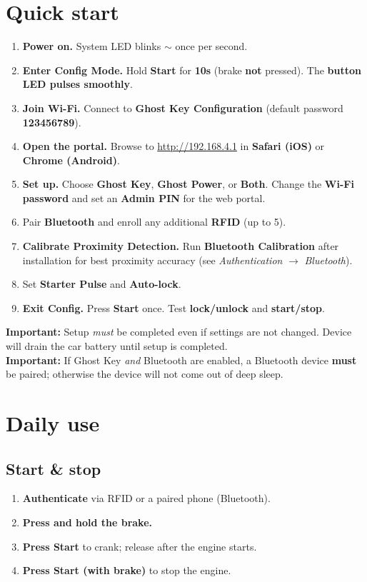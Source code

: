 \documentclass[11pt]{article}
\newcommand{\gkto}{\texorpdfstring{$\rightarrow$}{->}}
\begin{document}
\section{Quick start}
\begin{enumerate}
  \item \textbf{Power on.} System LED blinks \(\sim\) once per second.
  \item \textbf{Enter Config Mode.} Hold \textbf{Start} for \textbf{10s} (brake \textbf{not} pressed). The \textbf{button LED pulses smoothly}.
  \item \textbf{Join Wi-Fi.} Connect to \textbf{Ghost Key Configuration} (default password \textbf{123456789}).
  \item \textbf{Open the portal.} Browse to \url{http://192.168.4.1} in \textbf{Safari (iOS)} or \textbf{Chrome (Android)}.
  \item \textbf{Set up.} Choose \textbf{Ghost Key}, \textbf{Ghost Power}, or \textbf{Both}. Change the \textbf{Wi-Fi password} and set an \textbf{Admin PIN} for the web portal.
  \item Pair \textbf{Bluetooth} and enroll any additional \textbf{RFID} (up to 5).
  \item \textbf{Calibrate Proximity Detection.} Run \textbf{Bluetooth Calibration} after installation for best proximity accuracy (see \emph{Authentication} \gkto{} \emph{Bluetooth}).
  \item Set \textbf{Starter Pulse} and \textbf{Auto-lock}.
  \item \textbf{Exit Config.} Press \textbf{Start} once. Test \textbf{lock/unlock} and \textbf{start/stop}.
\end{enumerate}

\begin{gkimportant}
\textbf{Important:} Setup \emph{must} be completed even if settings are not changed. Device will drain the car battery until setup is completed.\\
\textbf{Important:} If Ghost Key \emph{and} Bluetooth are enabled, a Bluetooth device \textbf{must} be paired; otherwise the device will not come out of deep sleep.
\end{gkimportant}

\section{Daily use}
\subsection{Start \& stop}
\begin{enumerate}
  \item \textbf{Authenticate} via RFID or a paired phone (Bluetooth).
  \item \textbf{Press and hold the brake.}
  \item \textbf{Press Start} to crank; release after the engine starts.
  \item \textbf{Press Start (with brake)} to stop the engine.
\end{enumerate}
\end{document}
